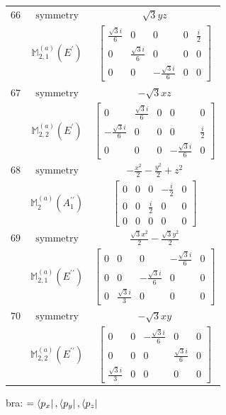 \documentclass[fleqn,8pt,landscape]{jsarticle}
\begin{document}
\begin{longtable}{ccc}
$ 66 $ & $ \text{symmetry} $ & $ \sqrt{3} y z $ \\
$  $ & $ \mathbb{M}_{2,1}^{(a)}(E^{\prime}) $ & $ \begin{bmatrix} \frac{\sqrt{3} i}{6} & 0 & 0 & 0 & \frac{i}{2} \\ 0 & \frac{\sqrt{3} i}{6} & 0 & 0 & 0 \\ 0 & 0 & - \frac{\sqrt{3} i}{6} & 0 & 0 \end{bmatrix} $ \\ \hline
$ 67 $ & $ \text{symmetry} $ & $ - \sqrt{3} x z $ \\
$  $ & $ \mathbb{M}_{2,2}^{(a)}(E^{\prime}) $ & $ \begin{bmatrix} 0 & \frac{\sqrt{3} i}{6} & 0 & 0 & 0 \\ - \frac{\sqrt{3} i}{6} & 0 & 0 & 0 & \frac{i}{2} \\ 0 & 0 & 0 & - \frac{\sqrt{3} i}{6} & 0 \end{bmatrix} $ \\ \hline
$ 68 $ & $ \text{symmetry} $ & $ - \frac{x^{2}}{2} - \frac{y^{2}}{2} + z^{2} $ \\
$  $ & $ \mathbb{M}_{2}^{(a)}(A_{1}^{\prime\prime}) $ & $ \begin{bmatrix} 0 & 0 & 0 & - \frac{i}{2} & 0 \\ 0 & 0 & \frac{i}{2} & 0 & 0 \\ 0 & 0 & 0 & 0 & 0 \end{bmatrix} $ \\ \hline
$ 69 $ & $ \text{symmetry} $ & $ \frac{\sqrt{3} x^{2}}{2} - \frac{\sqrt{3} y^{2}}{2} $ \\
$  $ & $ \mathbb{M}_{2,1}^{(a)}(E^{\prime\prime}) $ & $ \begin{bmatrix} 0 & 0 & 0 & - \frac{\sqrt{3} i}{6} & 0 \\ 0 & 0 & - \frac{\sqrt{3} i}{6} & 0 & 0 \\ 0 & \frac{\sqrt{3} i}{3} & 0 & 0 & 0 \end{bmatrix} $ \\ \hline
$ 70 $ & $ \text{symmetry} $ & $ - \sqrt{3} x y $ \\
$  $ & $ \mathbb{M}_{2,2}^{(a)}(E^{\prime\prime}) $ & $ \begin{bmatrix} 0 & 0 & - \frac{\sqrt{3} i}{6} & 0 & 0 \\ 0 & 0 & 0 & \frac{\sqrt{3} i}{6} & 0 \\ \frac{\sqrt{3} i}{3} & 0 & 0 & 0 & 0 \end{bmatrix} $ \\ \hline
\end{longtable}
bra: $=\bra{p_{x}}, \bra{p_{y}}, \bra{p_{z}}$
\end{document}
